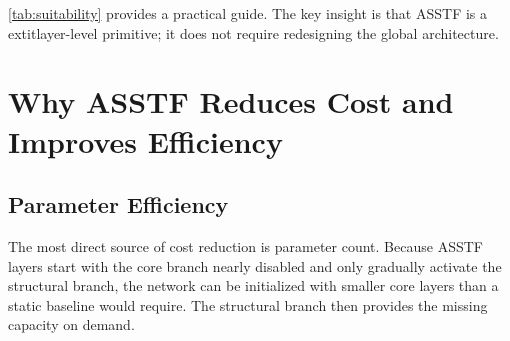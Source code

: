 \documentclass[11pt,a4paper]{article}
\theoremstyle{definition}
\begin{document}
\begin{table}[t]
\centering
\small
\setlength{\tabcolsep}{3pt}
\caption{Suitability matrix for ASSTF across model families and task characteristics.}
\label{tab:suitability}
\end{table}

\cref{tab:suitability} provides a practical guide. The key insight is that ASSTF is a 	extit{layer-level primitive}; it does not require redesigning the global architecture.


\section{Why ASSTF Reduces Cost and Improves Efficiency}
\label{sec:efficiency}

\subsection{Parameter Efficiency}
\label{subsec:param_eff}

The most direct source of cost reduction is parameter count. Because ASSTF layers start with the core branch nearly disabled and only gradually activate the structural branch, the network can be initialized with smaller core layers than a static baseline would require. The structural branch then provides the missing capacity on demand.
\end{document}
